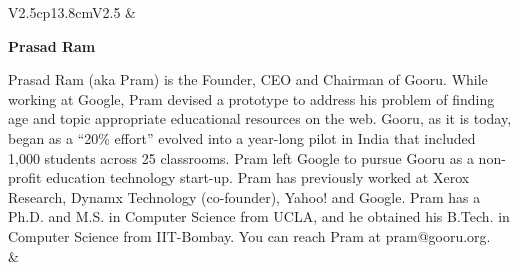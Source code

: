 \begin{tabular}{V{2.5}cp{13.8cm}V{2.5}}
 & 

\centerline{\large\bf Prasad Ram}

\bigskip
Prasad Ram (aka Pram) is the Founder, CEO and Chairman of Gooru. While working at Google, Pram devised a prototype to address his problem of finding age and topic appropriate educational resources on the web. Gooru, as it is today, began as a “20\% effort” evolved into a year-long pilot in India that included 1,000 students across 25 classrooms. Pram left Google to pursue Gooru as a non-profit education technology start-up. Pram has previously worked at Xerox Research, Dynamx Technology (co-founder), Yahoo! and Google. Pram has a Ph.D. and M.S. in Computer Science from UCLA, and he obtained his B.Tech. in Computer Science from IIT-Bombay. You can reach Pram at pram@gooru.org.\\
&\\  
\end{tabular}


\newpage

